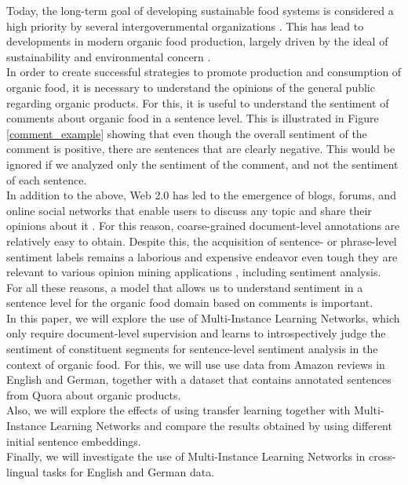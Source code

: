 Today, the  long-term  goal  of  developing  sustainable  food systems is considered a high priority by several intergovernmental  organizations \cite{Mie2017}. This has lead to developments in modern organic food production, largely driven by the ideal of sustainability and environmental concern \cite{healthyNutritiousFood}.\\
In order to create successful strategies to promote production and consumption of organic food, it is necessary to understand the opinions of the general public regarding organic products. For this, it is useful to understand the sentiment of comments about organic food in a sentence level. This is illustrated in Figure \ref{comment_example} showing that even though the overall sentiment of the comment is positive, there are sentences that are clearly negative. This would be ignored if we analyzed only the sentiment of the comment, and not the sentiment of each sentence.\\
In addition to the above, Web 2.0 has led to the emergence of blogs, forums, and online social networks that enable users to discuss any topic and share their opinions about it \cite{Dang_2020}. For this reason, coarse-grained document-level annotations are relatively easy to obtain. Despite this, the acquisition of  sentence-  or  phrase-level  sentiment  labels  remains  a  laborious  and  expensive endeavor even tough they are relevant to various opinion mining applications \cite{angelidis2017multiple}, including sentiment analysis.\\
For all these reasons, a model that allows us to understand sentiment in a sentence level for the organic food domain based on comments is important.\\
In this paper, we will explore the use of Multi-Instance Learning Networks, which only require document-level supervision and learns to introspectively judge the sentiment  of  constituent  segments \cite{angelidis2017multiple} for sentence-level sentiment analysis in the context of organic food. For this, we will use use data from Amazon reviews in English and German, together with a dataset that contains annotated sentences from Quora about organic products.\\
Also, we will explore the effects of using transfer learning together with Multi-Instance Learning Networks and compare the results obtained by using different initial sentence embeddings.\\
Finally, we will investigate the use of Multi-Instance Learning Networks in cross-lingual tasks for English and German data. \\
